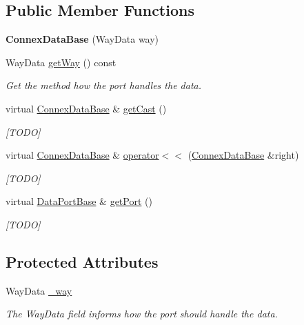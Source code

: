 \subsection*{Public Member Functions}
\begin{DoxyCompactItemize}
\item 
\mbox{\label{classfilter_1_1data_1_1_connex_data_base_a6b9e22543edbcfa71c7019b693b22806}} 
{\bfseries Connex\+Data\+Base} (Way\+Data way)
\item 
Way\+Data \hyperlink{classfilter_1_1data_1_1_connex_data_base_a1cfc155ebfbeb5f6a4538a52dafc2e42}{get\+Way} () const
\begin{DoxyCompactList}\small\item\em Get the method how the port handles the data. \end{DoxyCompactList}\item 
virtual \hyperlink{classfilter_1_1data_1_1_connex_data_base}{Connex\+Data\+Base} \& \hyperlink{classfilter_1_1data_1_1_connex_data_base_a7c009f9bb553638dd3a0031a8f04b044}{get\+Cast} ()
\begin{DoxyCompactList}\small\item\em \mbox{[}T\+O\+DO\mbox{]} \end{DoxyCompactList}\item 
virtual \hyperlink{classfilter_1_1data_1_1_connex_data_base}{Connex\+Data\+Base} \& \hyperlink{classfilter_1_1data_1_1_connex_data_base_a6d7080cbc59391a6c79ddc12442d6b62}{operator$<$$<$} (\hyperlink{classfilter_1_1data_1_1_connex_data_base}{Connex\+Data\+Base} \&right)
\begin{DoxyCompactList}\small\item\em \mbox{[}T\+O\+DO\mbox{]} \end{DoxyCompactList}\item 
virtual \hyperlink{classfilter_1_1data_1_1_data_port_base}{Data\+Port\+Base} \& \hyperlink{classfilter_1_1data_1_1_connex_data_base_a3cf1336815c061bc721f6b352900e6f4}{get\+Port} ()
\begin{DoxyCompactList}\small\item\em \mbox{[}T\+O\+DO\mbox{]} \end{DoxyCompactList}\end{DoxyCompactItemize}
\subsection*{Protected Attributes}
\begin{DoxyCompactItemize}
\item 
Way\+Data \hyperlink{classfilter_1_1data_1_1_connex_data_base_a965cbb08a6b61114aa3a66f3254b4f43}{\+\_\+way}
\begin{DoxyCompactList}\small\item\em The Way\+Data field informs how the port should handle the data. \end{DoxyCompactList}\end{DoxyCompactItemize}



